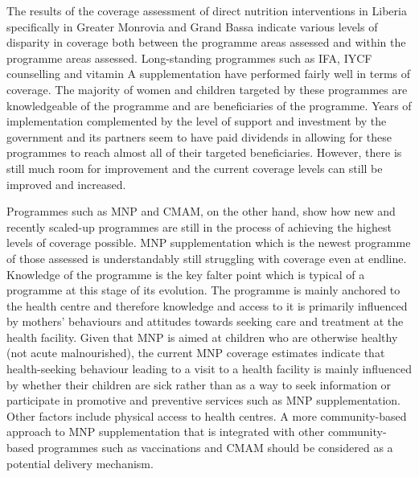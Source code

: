 \documentclass[12pt,a4paper]{article}
\begin{document}
The results of the coverage assessment of direct nutrition interventions in Liberia specifically in Greater Monrovia and Grand Bassa indicate various levels of disparity in coverage both between the programme areas assessed and within the programme areas assessed. Long-standing programmes such as IFA, IYCF counselling and vitamin A supplementation have performed fairly well in terms of coverage. The majority of women and children targeted by these programmes are knowledgeable of the programme and are beneficiaries of the programme. Years of implementation complemented by the level of support and investment by the government and its partners seem to have paid dividends in allowing for these programmes to reach almost all of their targeted beneficiaries. However, there is still much room for improvement and the current coverage levels can still be improved and increased.

Programmes such as MNP and CMAM, on the other hand, show how new and recently scaled-up programmes are still in the process of achieving the highest levels of coverage possible. MNP supplementation which is the newest programme of those assessed is understandably still struggling with coverage even at endline. Knowledge of the programme is the key falter point which is typical of a programme at this stage of its evolution. The programme is mainly anchored to the health centre and therefore knowledge and access to it is primarily influenced by mothers' behaviours and attitudes towards seeking care and treatment at the health facility. Given that MNP is aimed at children who are otherwise healthy (not acute malnourished), the current MNP coverage estimates indicate that health-seeking behaviour leading to a visit to a health facility is mainly influenced by whether their children are sick rather than as a way to seek information or participate in promotive and preventive services such as MNP supplementation. Other factors include physical access to health centres. A more community-based approach to MNP supplementation that is integrated with other community-based programmes such as vaccinations and CMAM should be considered as a potential delivery mechanism.
\end{document}
